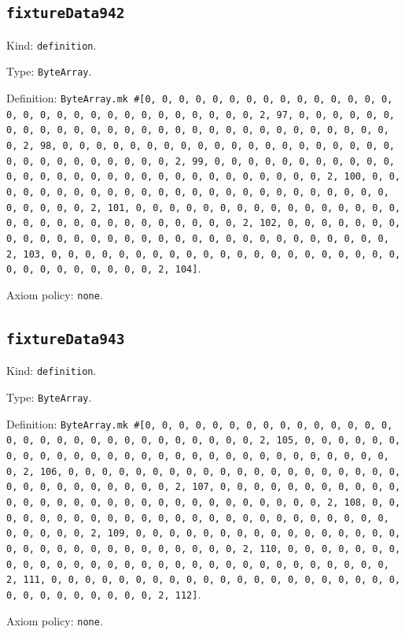 \documentclass[11pt]{article}
\begin{document}
\subsection*{\texttt{fixtureData942}}
\noindent Kind: \texttt{definition}.\par
\noindent Type: \texttt{ByteArray}.\par
\noindent Definition: \texttt{ByteArray.mk \#[0, 0, 0, 0, 0, 0, 0, 0, 0, 0, 0, 0, 0, 0, 0, 0, 0, 0, 0, 0, 0, 0, 0, 0, 0, 0, 0, 0, 0, 0, 2, 97, 0, 0, 0, 0, 0, 0, 0, 0, 0, 0, 0, 0, 0, 0, 0, 0, 0, 0, 0, 0, 0, 0, 0, 0, 0, 0, 0, 0, 0, 0, 2, 98, 0, 0, 0, 0, 0, 0, 0, 0, 0, 0, 0, 0, 0, 0, 0, 0, 0, 0, 0, 0, 0, 0, 0, 0, 0, 0, 0, 0, 0, 0, 2, 99, 0, 0, 0, 0, 0, 0, 0, 0, 0, 0, 0, 0, 0, 0, 0, 0, 0, 0, 0, 0, 0, 0, 0, 0, 0, 0, 0, 0, 0, 0, 2, 100, 0, 0, 0, 0, 0, 0, 0, 0, 0, 0, 0, 0, 0, 0, 0, 0, 0, 0, 0, 0, 0, 0, 0, 0, 0, 0, 0, 0, 0, 0, 2, 101, 0, 0, 0, 0, 0, 0, 0, 0, 0, 0, 0, 0, 0, 0, 0, 0, 0, 0, 0, 0, 0, 0, 0, 0, 0, 0, 0, 0, 0, 0, 2, 102, 0, 0, 0, 0, 0, 0, 0, 0, 0, 0, 0, 0, 0, 0, 0, 0, 0, 0, 0, 0, 0, 0, 0, 0, 0, 0, 0, 0, 0, 0, 2, 103, 0, 0, 0, 0, 0, 0, 0, 0, 0, 0, 0, 0, 0, 0, 0, 0, 0, 0, 0, 0, 0, 0, 0, 0, 0, 0, 0, 0, 0, 0, 2, 104]}.\par
\noindent Axiom policy: \texttt{none}.\par
\subsection*{\texttt{fixtureData943}}
\noindent Kind: \texttt{definition}.\par
\noindent Type: \texttt{ByteArray}.\par
\noindent Definition: \texttt{ByteArray.mk \#[0, 0, 0, 0, 0, 0, 0, 0, 0, 0, 0, 0, 0, 0, 0, 0, 0, 0, 0, 0, 0, 0, 0, 0, 0, 0, 0, 0, 0, 0, 2, 105, 0, 0, 0, 0, 0, 0, 0, 0, 0, 0, 0, 0, 0, 0, 0, 0, 0, 0, 0, 0, 0, 0, 0, 0, 0, 0, 0, 0, 0, 0, 2, 106, 0, 0, 0, 0, 0, 0, 0, 0, 0, 0, 0, 0, 0, 0, 0, 0, 0, 0, 0, 0, 0, 0, 0, 0, 0, 0, 0, 0, 0, 0, 2, 107, 0, 0, 0, 0, 0, 0, 0, 0, 0, 0, 0, 0, 0, 0, 0, 0, 0, 0, 0, 0, 0, 0, 0, 0, 0, 0, 0, 0, 0, 0, 2, 108, 0, 0, 0, 0, 0, 0, 0, 0, 0, 0, 0, 0, 0, 0, 0, 0, 0, 0, 0, 0, 0, 0, 0, 0, 0, 0, 0, 0, 0, 0, 2, 109, 0, 0, 0, 0, 0, 0, 0, 0, 0, 0, 0, 0, 0, 0, 0, 0, 0, 0, 0, 0, 0, 0, 0, 0, 0, 0, 0, 0, 0, 0, 2, 110, 0, 0, 0, 0, 0, 0, 0, 0, 0, 0, 0, 0, 0, 0, 0, 0, 0, 0, 0, 0, 0, 0, 0, 0, 0, 0, 0, 0, 0, 0, 2, 111, 0, 0, 0, 0, 0, 0, 0, 0, 0, 0, 0, 0, 0, 0, 0, 0, 0, 0, 0, 0, 0, 0, 0, 0, 0, 0, 0, 0, 0, 0, 2, 112]}.\par
\noindent Axiom policy: \texttt{none}.\par
\end{document}
